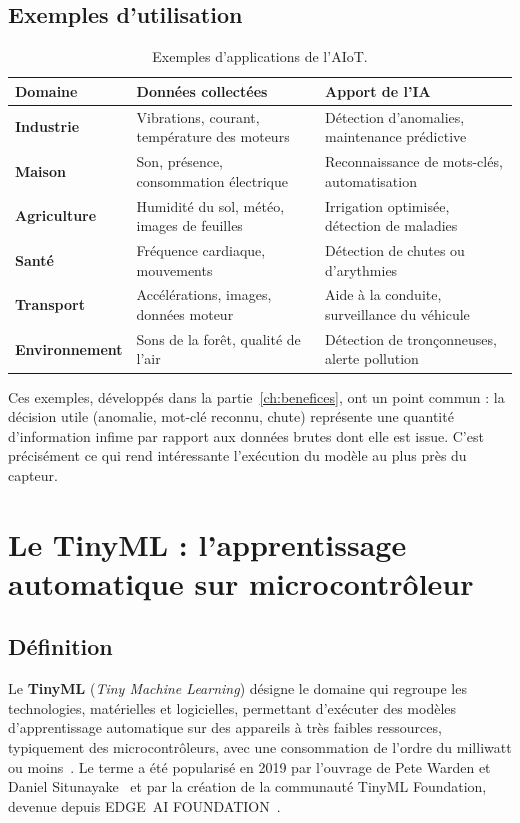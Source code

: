 \subsection{Exemples d'utilisation}

\begin{table}[H]
\centering
\small
\begin{tabularx}{\linewidth}{>{\bfseries}l X X}
\toprule
Domaine & Données collectées & Apport de l'IA \\
\midrule
Industrie      & Vibrations, courant, température des moteurs & Détection d'anomalies, maintenance prédictive \\
Maison         & Son, présence, consommation électrique & Reconnaissance de mots-clés, automatisation \\
Agriculture    & Humidité du sol, météo, images de feuilles & Irrigation optimisée, détection de maladies \\
Santé          & Fréquence cardiaque, mouvements & Détection de chutes ou d'arythmies \\
Transport      & Accélérations, images, données moteur & Aide à la conduite, surveillance du véhicule \\
Environnement  & Sons de la forêt, qualité de l'air & Détection de tronçonneuses, alerte pollution \\
\bottomrule
\end{tabularx}
\caption{Exemples d'applications de l'AIoT.}
\label{tab:exemples-aiot}
\end{table}

Ces exemples, développés dans la partie~\ref{ch:benefices}, ont un point
commun : la décision utile (\og anomalie\fg{}, \og mot-clé reconnu\fg{},
\og chute\fg{}) représente une quantité d'information infime par rapport aux
données brutes dont elle est issue. C'est précisément ce qui rend intéressante
l'exécution du modèle au plus près du capteur.

\newpage
\section{Le TinyML : l'apprentissage automatique sur microcontrôleur}
\label{sec:tinyml}

\subsection{Définition}

Le \textbf{TinyML} (\emph{Tiny Machine Learning}) désigne le domaine qui
regroupe les technologies, matérielles et logicielles, permettant d'exécuter
des modèles d'apprentissage automatique sur des appareils à très faibles
ressources, typiquement des microcontrôleurs, avec une consommation de l'ordre
du milliwatt ou moins~\cite{warden2019tinyml,banbury2020benchmarking}. Le
terme a été popularisé en 2019 par l'ouvrage de Pete Warden et Daniel
Situnayake~\cite{warden2019tinyml} et par la création de la communauté TinyML
Foundation, devenue depuis EDGE~AI FOUNDATION~\cite{tinymlfoundation}.

